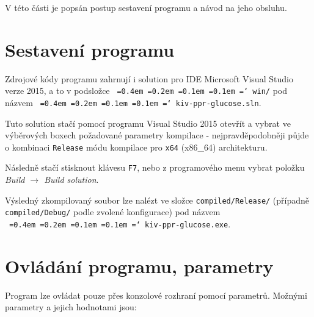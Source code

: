 \documentclass[]{thesiskiv}
\newcommand*\justify{
  \fontdimen2\font=0.4em
  \fontdimen3\font=0.2em
  \fontdimen4\font=0.1em
  \fontdimen7\font=0.1em
  \hyphenchar\font=`\-
}
\begin{document}
V této části je popsán postup sestavení programu a návod na jeho obsluhu. 

\section{Sestavení programu}

Zdrojové kódy programu zahrnují i solution pro IDE Microsoft Visual Studio verze 2015, a to v podsložce \texttt{\justify win/} pod názvem \texttt{\justify kiv-ppr-glucose.sln}.

Tuto solution stačí pomocí programu Visual Studio 2015 otevřít a vybrat ve výběrových boxech požadované parametry kompilace - nejpravděpodobněji půjde o kombinaci \texttt{Release} módu kompilace pro \texttt{x64} (x86\_64) architekturu.

Následně stačí stisknout klávesu \texttt{F7}, nebo z programového menu vybrat položku \emph{Build $\rightarrow$ Build solution}.

Výsledný zkompilovaný soubor lze nalézt ve složce \texttt{compiled/Release/} (případně \texttt{compiled/Debug/} podle zvolené konfigurace) pod názvem\\ \texttt{\justify kiv-ppr-glucose.exe}.

\section{Ovládání programu, parametry}

Program lze ovládat pouze přes konzolové rozhraní pomocí parametrů. Možnými parametry a jejich hodnotami jsou:
\end{document}
